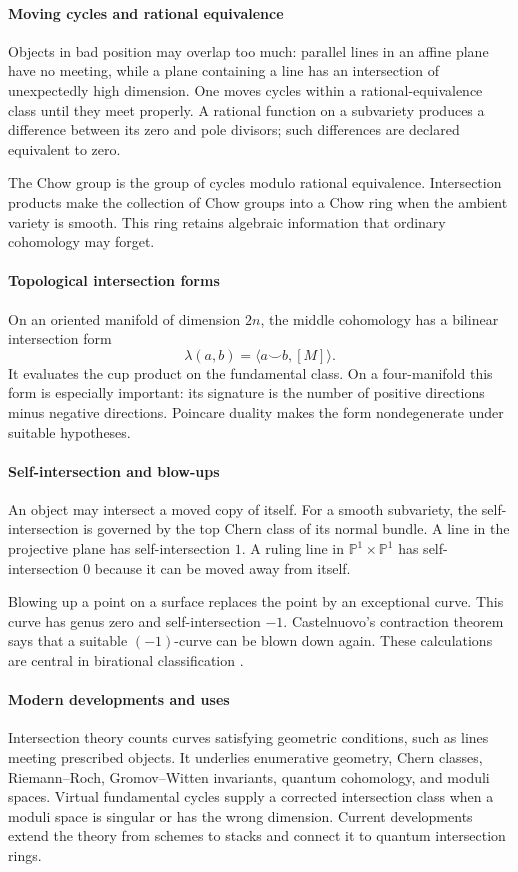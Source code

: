 \paragraph{Moving cycles and rational equivalence}
Objects in bad position may overlap too much: parallel lines in an affine plane have no meeting, while a plane containing a line has an intersection of unexpectedly high dimension. One moves cycles within a rational-equivalence class until they meet properly. A rational function on a subvariety produces a difference between its zero and pole divisors; such differences are declared equivalent to zero.

The Chow group is the group of cycles modulo rational equivalence. Intersection products make the collection of Chow groups into a Chow ring when the ambient variety is smooth. This ring retains algebraic information that ordinary cohomology may forget.

\paragraph{Topological intersection forms}
On an oriented manifold of dimension $2n$, the middle cohomology has a bilinear intersection form
\[
\lambda(a,b)=\langle a\smile b,[M]\rangle.
\]
It evaluates the cup product on the fundamental class. On a four-manifold this form is especially important: its signature is the number of positive directions minus negative directions. Poincare duality makes the form nondegenerate under suitable hypotheses.

\paragraph{Self-intersection and blow-ups}
An object may intersect a moved copy of itself. For a smooth subvariety, the self-intersection is governed by the top Chern class of its normal bundle. A line in the projective plane has self-intersection $1$. A ruling line in $\mathbb P^1\times\mathbb P^1$ has self-intersection $0$ because it can be moved away from itself.

Blowing up a point on a surface replaces the point by an exceptional curve. This curve has genus zero and self-intersection $-1$. Castelnuovo's contraction theorem says that a suitable $(-1)$-curve can be blown down again. These calculations are central in birational classification \cite{intersection_theory_ref3}.

\paragraph{Modern developments and uses}
Intersection theory counts curves satisfying geometric conditions, such as lines meeting prescribed objects. It underlies enumerative geometry, Chern classes, Riemann--Roch, Gromov--Witten invariants, quantum cohomology, and moduli spaces. Virtual fundamental cycles supply a corrected intersection class when a moduli space is singular or has the wrong dimension. Current developments extend the theory from schemes to stacks and connect it to quantum intersection rings.

